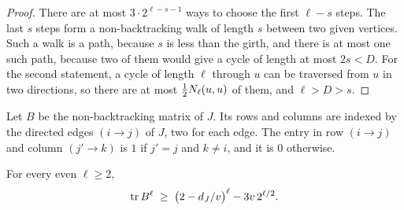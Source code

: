\begin{proof}
There are at most $3\cdot2^{\ell-s-1}$ ways to choose the first $\ell-s$ steps. The last $s$ steps
form a non-backtracking walk of length $s$ between two given vertices. Such a walk is a path,
because $s$ is less than the girth, and there is at most one such path, because two of them would
give a cycle of length at most $2s<D$. For the second statement, a cycle of length $\ell$ through $u$
can be traversed from $u$ in two directions, so there are at most $\tfrac12 N_\ell(u,u)$ of them, and
$\ell>D>s$.
\end{proof}

Let $B$ be the non-backtracking matrix of $J$. Its rows and columns are indexed by the directed
edges $(i\to j)$ of $J$, two for each edge. The entry in row $(i\to j)$ and column $(j'\to k)$ is
$1$ if $j'=j$ and $k\ne i$, and it is $0$ otherwise.

\begin{lemma}\label{lem:spectrum}
For every even $\ell\ge2$,
\[
  \operatorname{tr} B^{\ell}\;\ge\;\bigl(2-d_J/v\bigr)^{\ell}-3v\,2^{\ell/2}.
\]
\end{lemma}

